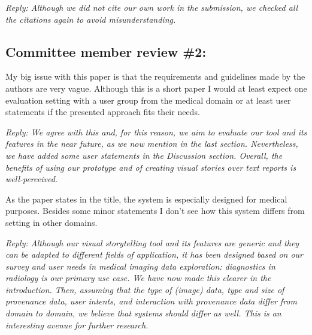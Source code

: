\documentclass{article}
\newcommand{\yun}[1]{{\color{blue}#1}}
\begin{document}
	{\em Reply: Although we did not cite our own work in the submission, we checked all the citations again to avoid misunderstanding.}
		
	\vspace{.5 cm}
	
	\subsection*{Committee member review \#2:}
	
	My big issue with this paper is that the requirements and guidelines made by the
	authors are very vague. Although this is a short paper I would at least expect one
	evaluation setting with a user group from the medical domain or at least user
	statements if the presented approach fits their needs.
	
	{\em Reply:
		We agree with this and, for this reason, we aim to evaluate our tool and its features in the near future, as we now mention in the last section.
			Nevertheless, we have added some user statements in the Discussion section. Overall, the benefits of using our prototype and of creating visual stories over text reports is well-perceived.
	}
	
	\vspace{.5 cm}
	
	As the paper states in the title, the system is especially designed for medical
		purposes. Besides some minor statements I don't see how this system differs from
		setting in other domains.
	
	
	{\em Reply: Although our visual storytelling tool and its features are generic and they can be adapted to different fields of application, it has been designed based on our survey and user needs in medical imaging data exploration: diagnostics in radiology is our primary use case. We have now made this clearer in the introduction. Then, assuming that the type of (image) data, type and size of provenance data, user intents, and interaction with provenance data differ from domain to domain, we believe that systems should differ as well. This is an interesting avenue for further research.}
	
\end{document}
